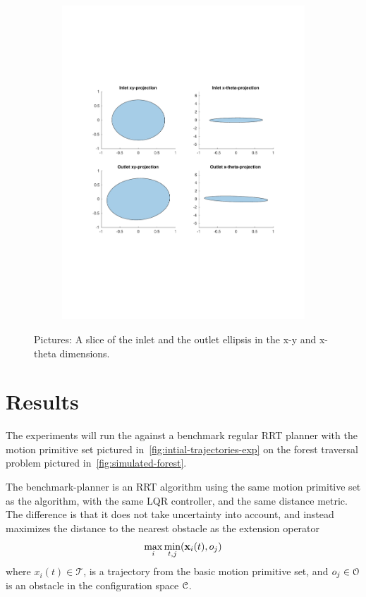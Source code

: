 \begin{figure}
\begin{subfigure}[b]{0.4\textwidth}
    \includegraphics[width=\textwidth]{figures/experiments/sos-calculation-inlet-outlet}
  \end{subfigure}
  \caption{Pictures: A slice of the inlet and the outlet ellipsis in the x-y and
    x-theta dimensions.}
  \label{fig:funnel-conv}
\end{figure}

\section{Results}
\label{sec:experiments-final}

The experiments will run the \rrtfunnel{} against a benchmark regular RRT
planner with the motion primitive set pictured
in~\cref{fig:intial-trajectories-exp} on the forest traversal problem pictured
in~\cref{fig:simulated-forest}.

The benchmark-planner is an \ac{RRT} algorithm using the same motion primitive
set as the \rrtfunnel{} algorithm, with the same \ac{LQR} controller, and the
same distance metric. The difference is that it does not take uncertainty into
account, and instead maximizes the distance to the nearest obstacle as the
extension operator \ie{}
\begin{equation}
  \max_{i}\min_{t,j}(\mathbf{x}_{i}(t), o_{j})
\end{equation}
where \(x_{i}(t) \in \mathcal{T}\), is a trajectory from the basic motion
primitive set, and \(o_{j} \in \mathcal{O}{}\) is an obstacle in the
configuration space \(\mathcal{C}{}\).


